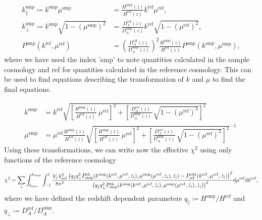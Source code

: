 \documentclass[../main.tex]{subfiles}
\begin{document}
 \begin{align}
    k_\|^\mathrm{smp} \coloneqq k^\mathrm{smp} \mu^\mathrm{smp} &= \frac{H^\mathrm{smp}(z)}{H^\mathrm{ref}(z)} k^\mathrm{ref} \mu^\mathrm{ref}, \nonumber\\
    k_\perp^\mathrm{smp} \coloneqq k^\mathrm{smp} \sqrt{1-\left(\mu^\mathrm{smp}\right)^2} &= \frac{D^\mathrm{ref}_A(z)}{D^\mathrm{smp}_A(z)} k^\mathrm{ref} \sqrt{1-\left(\mu^\mathrm{ref}\right)^2}, \nonumber\\
    P^\mathrm{smp}(k^\mathrm{ref},\mu^\mathrm{ref}) &= \left(\frac{D^\mathrm{ref}_A(z)}{D^\mathrm{smp}_A(z)} \right)^2 \frac{H^\mathrm{smp}(z)}{H^\mathrm{ref}(z)} P^\mathrm{smp}(k^\mathrm{smp},\mu^\mathrm{smp}),\label{eq:Alcock-Paczynski}
 \end{align}
where we have used the index 'smp' to note quantities calculated in the sample cosmology and ref for quantities calculated in the reference cosmology. This can be used to find equations describing the transformation of $k$ and $\mu$ to find the final equations.

\begin{align}
    k^\mathrm{smp} &= k^\mathrm{ref} \sqrt{\left[\frac{H^\mathrm{smp}(z)}{H^\mathrm{ref}(z)} \, \mu^\mathrm{ref} \right]^2 + \left[ \frac{D^\mathrm{ref}_A(z)}{D^\mathrm{smp}_A(z)} \, \sqrt{1-\left(\mu^\mathrm{ref}\right)^2} \right]^2 } \nonumber\\
    \mu^\mathrm{smp} &= \mu^\mathrm{ref} \frac{H^\mathrm{smp}(z)}{H^\mathrm{ref}(z)} \sqrt{\left[\frac{H^\mathrm{smp}(z)}{H^\mathrm{ref}(z)} \, \mu^\mathrm{ref} \right]^2 + \left[ \frac{D^\mathrm{ref}_A(z)}{D^\mathrm{smp}_A(z)} \, \sqrt{1-\left(\mu^\mathrm{ref}\right)^2} \right]^2 }^{-1}\: \label{eq:observed_kmu}
\end{align}
Using these transformations, we can write now the effective $\chi^2$  using only functions of the reference cosmology

\begin{equation*}
    \chi^2 = \sum_i \int_{k_\mathrm{min}}^{k_\mathrm{max}} \int_{-1}^{1} \frac{V_i\, k_\mathrm{ref}^2 }{8 \pi^2} 
    \frac{\left( q_\| q_\perp^2 P^\mathrm{th}_\mathrm{smp}(k^\mathrm{smp}(k^\mathrm{ref},\mu^\mathrm{ref},\bar{z}_i),\mu^\mathrm{smp}(\mu^\mathrm{ref},\bar{z}_i),\bar{z}_i)
    -P_\mathrm{ref}^\mathrm{obs}(k^\mathrm{ref},\mu^\mathrm{ref},\bar{z}_i)\right)^2}
    {\left( q_\| q_\perp^2 P^\mathrm{th}_\mathrm{smp}(k^\mathrm{smp}(k^\mathrm{ref},\mu^\mathrm{ref},\bar{z}_i),\mu^\mathrm{smp}(\mu^\mathrm{ref},\bar{z}_i),\bar{z}_i)\right)^2} \mathrm{d} \mu^\mathrm{ref} \mathrm{d} k^\mathrm{ref},
\end{equation*}
where we have defined the redshift dependent parameters $q_\| \coloneq H^\mathrm{smp}/H^\mathrm{ref}$ and $q_\perp \coloneq D_A^\mathrm{ref}/D_A^\mathrm{smp}$.\\
\end{document}
